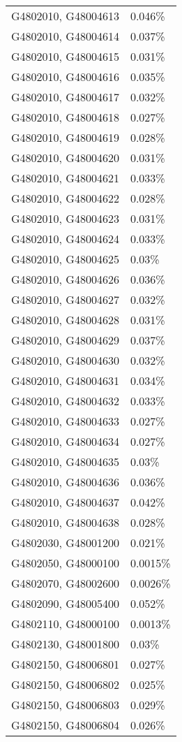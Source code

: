 \begin{longtable}[]{@{}ll@{}}
G4802010, G48004613 & 0.046\% \\
G4802010, G48004614 & 0.037\% \\
G4802010, G48004615 & 0.031\% \\
G4802010, G48004616 & 0.035\% \\
G4802010, G48004617 & 0.032\% \\
G4802010, G48004618 & 0.027\% \\
G4802010, G48004619 & 0.028\% \\
G4802010, G48004620 & 0.031\% \\
G4802010, G48004621 & 0.033\% \\
G4802010, G48004622 & 0.028\% \\
G4802010, G48004623 & 0.031\% \\
G4802010, G48004624 & 0.033\% \\
G4802010, G48004625 & 0.03\% \\
G4802010, G48004626 & 0.036\% \\
G4802010, G48004627 & 0.032\% \\
G4802010, G48004628 & 0.031\% \\
G4802010, G48004629 & 0.037\% \\
G4802010, G48004630 & 0.032\% \\
G4802010, G48004631 & 0.034\% \\
G4802010, G48004632 & 0.033\% \\
G4802010, G48004633 & 0.027\% \\
G4802010, G48004634 & 0.027\% \\
G4802010, G48004635 & 0.03\% \\
G4802010, G48004636 & 0.036\% \\
G4802010, G48004637 & 0.042\% \\
G4802010, G48004638 & 0.028\% \\
G4802030, G48001200 & 0.021\% \\
G4802050, G48000100 & 0.0015\% \\
G4802070, G48002600 & 0.0026\% \\
G4802090, G48005400 & 0.052\% \\
G4802110, G48000100 & 0.0013\% \\
G4802130, G48001800 & 0.03\% \\
G4802150, G48006801 & 0.027\% \\
G4802150, G48006802 & 0.025\% \\
G4802150, G48006803 & 0.029\% \\
G4802150, G48006804 & 0.026\% \\

\end{longtable}
